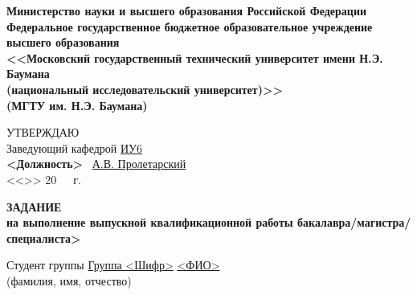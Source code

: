\documentclass[utf8x, 14pt, oneside, a4paper]{article}
\begin{document}
	\thispagestyle{empty}
	\begin{center}
		\fontsize{12pt}{0.3\baselineskip}\selectfont \textbf{Министерство науки и высшего образования Российской Федерации 
		\\ Федеральное государственное бюджетное образовательное учреждение 
		\\ высшего образования 
		\\ <<Московский государственный технический университет имени Н.Э. Баумана
		\\ (национальный исследовательский университет)>>
		\\ (МГТУ им. Н.Э. Баумана)}
		
		\fontsize{12pt}{0.5\baselineskip}\selectfont
		\noindent \makebox[\linewidth]{\rule{\textwidth}{4pt}} \makebox[\linewidth]{\rule{\textwidth}{1pt}}
	\end{center}

	\begin{flushright}
		\fontsize{12pt}{\baselineskip}\selectfont 
		УТВЕРЖДАЮ \hspace*{1.4cm}
		\\ Заведующий кафедрой \uline{\hspace*{0.5cm}}\uline{ИУ6}\uline{\hspace*{0.5cm}} 
		\\ \hfill \textbf{<Должность>} \uline{\hspace*{2.5cm}} \ \uline{А.В. Пролетарский} 
		\\ <<\uline{\hspace*{1cm}}>> \uline{\hspace*{2.5cm}} 20\ \ \   г.
	\end{flushright}

	\vfill

	\begin{center}
		\fontsize{18pt}{\baselineskip}\selectfont \textbf{ЗАДАНИЕ}
		\\ \fontsize{16pt}{\baselineskip}\selectfont \textbf{на выполнение выпускной квалификационной работы бакалавра/магистра/специалиста>}
	\end{center}

	\normalsize

	\begin{flushleft}
		\fontsize{12pt}{\baselineskip}\selectfont

		Студент группы  \uline{\hspace*{0.5cm}}\uline{Группа <Шифр>}\uline{\hspace*{0.5cm}}
		\center \uline{ \hfill} 
		\\ (фамилия, имя, отчество)
	\end{flushleft}
\end{document}

